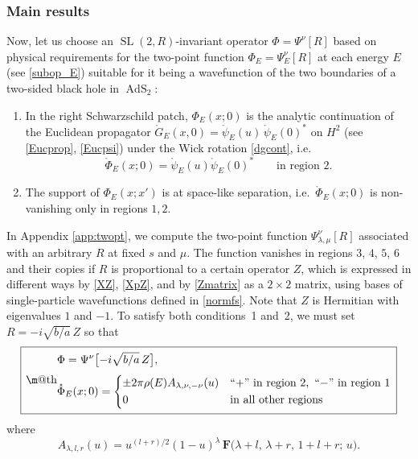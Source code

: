 \documentclass[11pt]{article}
\makeatletter
\newcommand{\be}{\begin{equation}}
\newcommand{\ee}{\end{equation}}
\newcommand*{\wideboxed}[1]{\setlength{\fboxsep}{1ex}%
  \fbox{\m@th$\displaystyle#1$}}
\newcommand{\hgfs}{\mathbf{F}}
\newcommand{\RR}{\mathbb{R}}
\DeclareMathOperator{\tSL}{\widetilde{\mathrm{SL}}}
\DeclareMathOperator{\tAdS}{\widetilde{AdS}}
\DeclareMathOperator{\HH}{H}
\newcommand{\rpsi}{\mathring{\psi}}
\newcommand{\rG}{\mathring{G}}
\newcommand{\lam}{\lambda}
\def\ie{i.e.\ }
\def\widetilde#1{#1}%
\def\HH{H}
\def\RR{R}
\makeatother
\begin{document}
\subsubsection{Main results}\label{sec_tswf}

Now, let us choose an $\tSL(2,\RR)$-invariant operator $\Phi=\Psi^{\nu}[R]$ based on physical requirements for the two-point function $\Phi_E=\Psi^{\nu}_E[R]$ at each energy $E$ (see \eqref{subop_E}) suitable for it being a wavefunction of the two boundaries of a two-sided black hole in $\tAdS_2$:

\begin{enumerate}

\item
In the right Schwarzschild patch, $\Phi_E(x;0)$ is the analytic continuation of the Euclidean propagator $\rG_E(x,0)=\rpsi_E(u)\,\rpsi_E(0)^*$ on $\HH^2$ (see \eqref{Eucprop}, \eqref{Eucpsi}) under the Wick rotation \eqref{dgcont}, \ie
\be \label{match}
\mathring{\Phi}_E(x;0)=\mathring{\psi}_E(u)\mathring{\psi}_E(0)^* \qquad \text{in region $2$.}
\ee

\item
The support of $\Phi_E(x;x')$ is at space-like separation, \ie $\mathring{\Phi}_E(x;0)$ is non-vanishing only in regions $1,2$.

\end{enumerate}
In Appendix \ref{app:twopt}, we compute the  two-point function $\Psi^{\nu}_{\lam, \mu}[R]$ associated with an arbitrary $R$ at fixed $s$ and $\mu$. The function vanishes in regions $3$, $4$, $5$, $6$ and their copies if $R$ is proportional to a certain operator $Z$, which is expressed in different ways by \eqref{XZ}, \eqref{XpZ}, and by \eqref{Zmatrix} as a $2\times 2$ matrix, using bases of single-particle wavefunctions defined in \eqref{normfs}. Note that $Z$ is Hermitian with eigenvalues $1$ and $-1$. To satisfy both conditions~1 and~2, we must set $R=-i \sqrt{b/a}\,Z$ so that 
\be \label{Phi}
\wideboxed{\begin{aligned}
&\Phi=\Psi^{\nu}\bigl[-i \sqrt{b/a}\,Z\bigr],\\[3pt]
&\mathring{\Phi}_E(x;0)=\begin{dcases}
\pm 2\pi\rho(E) A_{\lam, \nu, -\nu}(u) & \text{``$+$'' in region $2$,\, ``$-$'' in region $1$}\\
0 & \text{in all other regions}
\end{dcases}
\end{aligned}}
\ee
where 
\begin{equation} \label{MAf}
A_{\lambda,l,r}(u)=u^{(l+r)/2}(1-u)^{\lambda}\,
\hgfs\bigl(\lambda+l,\,\lambda+r,\,1+l+r;\,u\bigr).
\end{equation}
\end{document}
